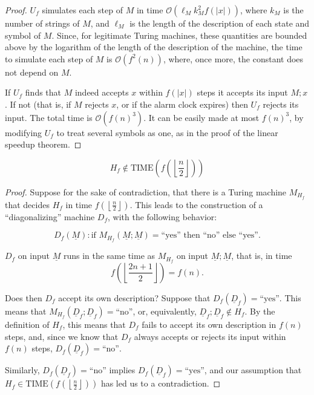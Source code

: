 \documentclass[12pt]{article}
\begin{document}
\begin{proof}
  $U_f$ simulates each step of $M$ in time $\mathcal{O}(\ell_M k_M^2 f(|x|))$, where $k_M$ is the number of strings of $M$, and $\ell_M$ is the length of the description of each state and symbol of $M$. Since, for legitimate Turing machines, these quantities are bounded above by the logarithm of the length of the description of the machine, the time to simulate each step of $M$ is $\mathcal{O}(f^2(n))$, where, once more, the constant does not depend on $M$.
  
  If $U_f$ finds that $M$ indeed accepts $x$ within $f(|x|)$ steps it accepts its input $M; x$. If not (that is, if $M$ rejects $x$, or if the alarm clock expires) then $U_f$ rejects its input. The total time is $\mathcal{O}(f(n)^3)$. It can be easily made at most $f(n)^3$, by modifying $U_f$ to treat several symbols as one, as in the proof of the linear speedup theorem.
\end{proof}

\begin{defbox}
  $$H_f \notin \text{TIME}\left(f\left(\left\lfloor \frac{n}{2} \right\rfloor\right)\right)$$
\end{defbox}
\begin{proof}
  Suppose for the sake of contradiction, that there is a Turing machine $M_{H_f}$ that decides $H_f$ in time $f\left(\left\lfloor \frac{n}{2} \right\rfloor\right)$. This leads to the construction of a ``diagonalizing'' machine $D_f$, with the following behavior:

  \[
  D_f(\underline M) : \text{if } M_{H_f}(\underline M;\underline M) = \text{``yes'' then ``no'' else ``yes''}.
  \]
  
  $D_f$ on input $\underline M$ runs in the same time as $M_{H_f}$ on input $\underline M; \underline M$, that is, in time 
  \[
  f\left(\left\lfloor \frac{2n+1}{2} \right\rfloor\right) = f(n).
  \]
  
  Does then $D_f$ accept its own description? Suppose that $D_f(\underline D_f) = \text{``yes''}$. This means that $M_{H_f}(\underline D_f;\underline D_f) = \text{``no''}$, or, equivalently, $\underline D_f;\underline D_f \notin H_f$. By the definition of $H_f$, this means that $D_f$ fails to accept its own description in $f(n)$ steps, and, since we know that $D_f$ always accepts or rejects its input within $f(n)$ steps, $D_f(\underline D_f) = \text{``no''}$. 
  
  Similarly, $D_f(\underline D_f) = \text{``no''}$ implies $D_f(\underline D_f) = \text{``yes''}$, and our assumption that $H_f \in \text{TIME}\left(f\left(\left\lfloor \frac{n}{2} \right\rfloor\right)\right)$ has led us to a contradiction.
\end{proof}
\end{document}
